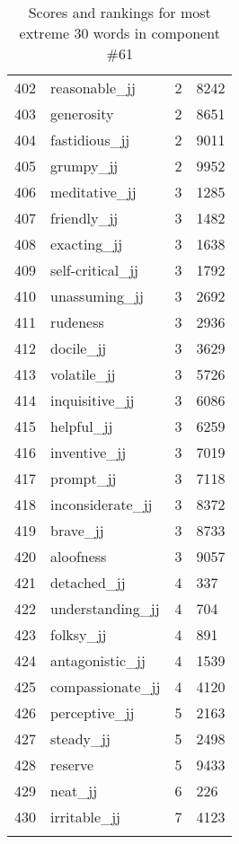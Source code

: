 \begin{longtable}[!htbp]{| rlr@{.}l |}
    402 & reasonable\_jj & 2 & 8242 \\
    403 & generosity & 2 & 8651 \\
    404 & fastidious\_jj & 2 & 9011 \\
    405 & grumpy\_jj & 2 & 9952 \\
    406 & meditative\_jj & 3 & 1285 \\
    407 & friendly\_jj & 3 & 1482 \\
    408 & exacting\_jj & 3 & 1638 \\
    409 & self-critical\_jj & 3 & 1792 \\
    410 & unassuming\_jj & 3 & 2692 \\
    411 & rudeness & 3 & 2936 \\
    412 & docile\_jj & 3 & 3629 \\
    413 & volatile\_jj & 3 & 5726 \\
    414 & inquisitive\_jj & 3 & 6086 \\
    415 & helpful\_jj & 3 & 6259 \\
    416 & inventive\_jj & 3 & 7019 \\
    417 & prompt\_jj & 3 & 7118 \\
    418 & inconsiderate\_jj & 3 & 8372 \\
    419 & brave\_jj & 3 & 8733 \\
    420 & aloofness & 3 & 9057 \\
    421 & detached\_jj & 4 & 337 \\
    422 & understanding\_jj & 4 & 704 \\
    423 & folksy\_jj & 4 & 891 \\
    424 & antagonistic\_jj & 4 & 1539 \\
    425 & compassionate\_jj & 4 & 4120 \\
    426 & perceptive\_jj & 5 & 2163 \\
    427 & steady\_jj & 5 & 2498 \\
    428 & reserve & 5 & 9433 \\
    429 & neat\_jj & 6 & 226 \\
    430 & irritable\_jj & 7 & 4123 \\
    \hline
    \caption{Scores and rankings for most extreme 30 words in component \#61} \\
\end{longtable}
